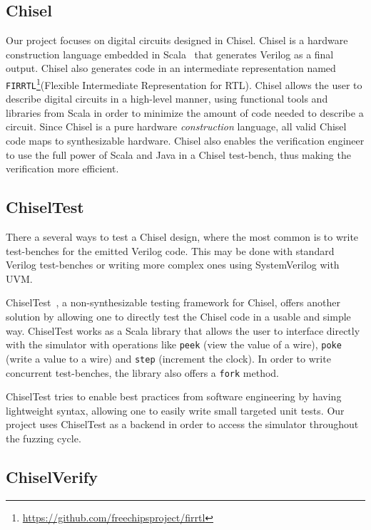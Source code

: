 \documentclass[conference]{IEEEtran}
\begin{document}
\subsection{Chisel}
Our project focuses on digital circuits designed in Chisel.
Chisel is a hardware construction language embedded in Scala~\cite{chisel:dac2012} that generates Verilog as a final output.
Chisel also generates code in an intermediate representation named \texttt{FIRRTL}\footnote{\url{https://github.com/freechipsproject/firrtl}}(Flexible Intermediate Representation for RTL).
Chisel allows the user to describe digital circuits in a high-level manner, using functional tools and libraries from Scala in order to minimize the amount of code needed to describe a circuit.
Since Chisel is a pure hardware \emph{construction} language, all valid Chisel code maps to synthesizable hardware.
Chisel also enables the verification engineer to use the full power of Scala and Java in a Chisel test-bench, thus making the verification more efficient.

\subsection{ChiselTest}
 
There a several ways to test a Chisel design, where the most common is to write test-benches for the emitted Verilog code.
This may be done with standard Verilog test-benches or writing more complex ones using SystemVerilog with UVM.
 
ChiselTest~\cite{chisel:tester2}, a non-synthesizable testing framework for Chisel, offers another solution by allowing one to directly test the Chisel code in a usable and simple way.
ChiselTest works as a Scala library that allows the user to interface directly with the simulator with operations like \texttt{peek} (view the value of a wire), \texttt{poke} (write a value to a wire) and \texttt{step} (increment the clock).
In order to write concurrent test-benches, the library also offers a \texttt{fork} method.

ChiselTest tries to enable best practices from software engineering by having lightweight syntax, allowing one to easily write small targeted unit tests.
Our project uses ChiselTest as a backend in order to access the simulator throughout the fuzzing cycle.

\subsection{ChiselVerify}
\end{document}
